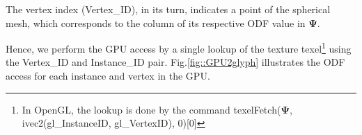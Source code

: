 \documentclass[twoside,twocolumn,10pt]{article}
\begin{document}
The vertex index (Vertex\_ID), in its turn, indicates a point of the spherical mesh, which corresponds to the column of its respective ODF value in $\bm{\Psi}$.

Hence, we perform the GPU access by a single lookup of the texture texel\footnote{In OpenGL, the lookup is done by the command texelFetch($\bm{\Psi}$, ivec2(gl\_InstanceID, gl\_VertexID), 0)[0]} using the Vertex\_ID and Instance\_ID pair. Fig.\ref{fig::GPU2glyph} illustrates the ODF access for each instance and vertex in the GPU.


\end{document}
